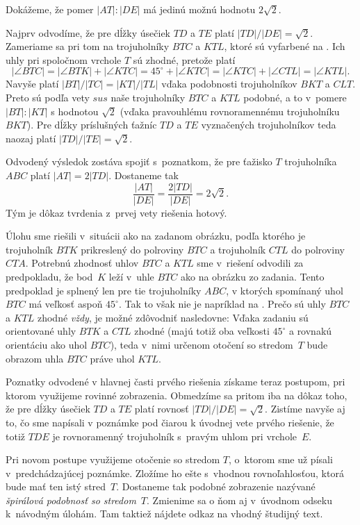 {%
Dokážeme, že pomer $|AT|:|DE|$ má jedinú možnú
hodnotu $2\sqrt{2}$.

Najprv odvodíme, že pre dĺžky úsečiek $TD$ a $TE$ platí
$|TD|/|DE|=\sqrt2$. Zameriame sa pri tom na trojuholníky $BTC$ a $KTL$, ktoré sú
vyfarbené na \obr{}. Ich uhly pri spoločnom vrchole $T$
sú zhodné, pretože platí
$$
|\angle BTC|=|\angle BTK|\!+\!|\angle KTC|=
45^\circ\!+\!|\angle KTC|=|\angle KTC|\!+\!|\angle CTL|=|\angle KTL|.
$$
Navyše platí $|BT|/|TC|=|KT|/|TL|$ vďaka podobnosti trojuholníkov
$BKT$ a $CLT$. Preto sú podľa vety $sus$ naše trojuholníky $BTC$ a
$KTL$ podobné, a to v~pomere $|BT|:|KT|$ s hodnotou $\sqrt2$
(vďaka pravouhlému rovnoramennému trojuholníku $BKT$).
Pre dĺžky príslušných ťažníc $TD$ a $TE$ vyznačených trojuholníkov teda
naozaj platí $|TD|/|TE|=\sqrt{2}$.
%

Odvodený výsledok zostáva spojiť s~poznatkom, že pre ťažisko $T$
trojuholníka $ABC$ platí $|AT|=2|TD|$. Dostaneme tak
$$
\frac{|AT|}{|DE|}=\frac{2|TD|}{|DE|}=2\sqrt{2}.
$$
Tým je dôkaz tvrdenia z~prvej vety riešenia hotový.

\poznamka
Úlohu sme riešili v~situácii ako na zadanom obrázku, podľa ktorého
je trojuholník $BTK$ prikreslený do polroviny $BTC$ a trojuholník $CTL$ do
polroviny $CTA$. Potrebnú zhodnosť uhlov $BTC$ a $KTL$ sme
v~riešení odvodili za predpokladu, že bod~$K$ leží v~uhle $BTC$
ako na obrázku zo zadania. Tento predpoklad je splnený
len pre tie trojuholníky $ABC$,
v ktorých spomínaný uhol~$BTC$ má veľkosť aspoň $45^\circ$.
Tak to však nie je napríklad na \obr.
Prečo sú uhly $BTC$ a $KTL$ zhodné {\it vždy}, je možné zdôvodniť nasledovne:
Vďaka zadaniu sú orientované uhly
$BTK$ a $CTL$ zhodné (majú totiž oba veľkosti $45^\circ$ a
rovnakú orientáciu ako uhol $BTC$), teda v~nimi určenom
otočení so stredom~$T$ bude obrazom uhla $BTC$ práve uhol $KTL$.
%

\ineriesenie
Poznatky odvodené v hlavnej časti prvého riešenia získame
teraz postupom, pri ktorom využijeme rovinné zobrazenia.
Obmedzíme sa pritom iba na dôkaz toho,
že pre dĺžky úsečiek $TD$ a $TE$
platí rovnosť $|TD|/|DE|=\sqrt2$. Zistíme navyše aj to,
čo sme napísali v poznámke pod čiarou k úvodnej vete prvého
riešenie, že totiž $TDE$ je rovnoramenný trojuholník s~pravým uhlom
pri vrchole~$E$.

Pri novom postupe využijeme otočenie so stredom $T$,
o~ktorom sme už písali v~predchádzajúcej poznámke. Zložíme
ho ešte s~vhodnou rovnoľahlosťou, ktorá bude mať
ten istý stred~$T$. Dostaneme tak podobné zobrazenie nazývané
{\it špirálová podobnosť so stredom\/}~$T$.
Zmienime sa o ňom aj v~úvodnom odseku k~návodným úlohám. Tam
taktiež nájdete odkaz na vhodný študijný text.

}
